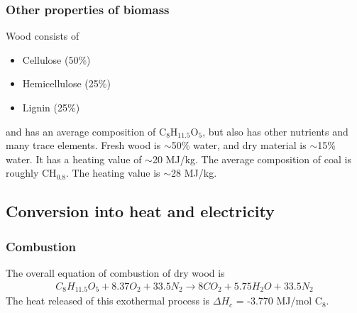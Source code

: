 \documentclass[a4paper,10pt]{article}
\begin{document}
\subsubsection{Other properties of biomass}
Wood consists of
\begin{itemize}
 \item Cellulose (50\%)
 \item Hemicellulose (25\%)
 \item Lignin (25\%)
\end{itemize}
and has an average composition of C$_8$H$_{11.5}$O$_5$, but also has other nutrients and many trace elements. Fresh wood is $\sim$50\% water, and dry material is $\sim$15\% water. It has a heating value of $\sim$20 MJ/kg. The average composition of coal is roughly CH$_{0.8}$. The heating value is $\sim$28 MJ/kg.

\subsection{Conversion into heat and electricity}
\subsubsection{Combustion}
The overall equation of combustion of dry wood is
\begin{align}
 C_8H_{11.5}O_5 + 8.37O_2 + 33.5N_2 \rightarrow 8 CO_2 + 5.75H_2O + 33.5N_2
\end{align}
The heat released of this exothermal process is $\Delta H_c$ = -3.770 MJ/mol C$_8$.
\end{document}
